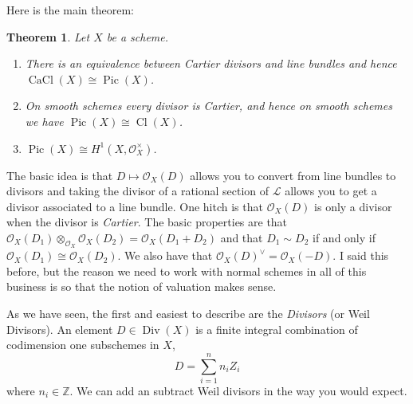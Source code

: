 \documentclass[12pt]{article}
\numberwithin{equation}{section}
\newtheorem{theorem}{Theorem}[subsection]
\theoremstyle{definition}
\theoremstyle{remark}
\newcommand{\Ocal}{\mathcal{O}}
\newcommand{\Div}{\operatorname{Div}}
\newcommand{\CaCl}{\operatorname{CaCl}}
\newcommand{\Pic}{\operatorname{Pic}}
\newcommand{\Cl}{\operatorname{Cl}}
\newcommand{\Lcal}{\mathcal{L}}
\begin{document}
Here is the main theorem:
\begin{theorem}
	Let $X$ be a scheme. 
	\begin{enumerate}
	\item There is an equivalence between Cartier divisors and line bundles and hence $\CaCl(X) \cong \Pic(X)$.
	\item On smooth schemes every divisor is Cartier, and hence on smooth schemes we have $\Pic(X) \cong \Cl(X)$.
	\item $\Pic(X) \cong H^1(X,\Ocal_X^{\times})$. 
	\end{enumerate}
\end{theorem}

The basic idea is that $D \mapsto \Ocal_X(D)$ allows you to convert from line bundles to divisors and taking the divisor of a rational section of $\Lcal$ allows you to get a divisor associated to a line bundle.
One hitch is that $\Ocal_X(D)$ is only a divisor when the divisor is \emph{Cartier}.
The basic properties are that $\Ocal_X(D_1) \otimes_{\Ocal_X} \Ocal_X(D_2) = \Ocal_X(D_1+D_2)$ and that $D_1\sim D_2$ if and only if $\Ocal_X(D_1) \cong \Ocal_X(D_2)$. 
We also have that $\Ocal_X(D)^{\vee} = \Ocal_X(-D)$.
I said this before, but the reason we need to work with normal schemes in all of this business is so that the notion of valuation makes sense.

As we have seen, the first and easiest to describe are the \emph{Divisors} (or Weil Divisors). An element $D\in \Div(X)$ is a finite integral combination of codimension one subschemes in $X$,
$$ D = \sum_{i=1}^n n_i Z_i $$
where $n_i\in\mathbb Z$. We can add an subtract Weil divisors in the way you would expect.
\end{document}
